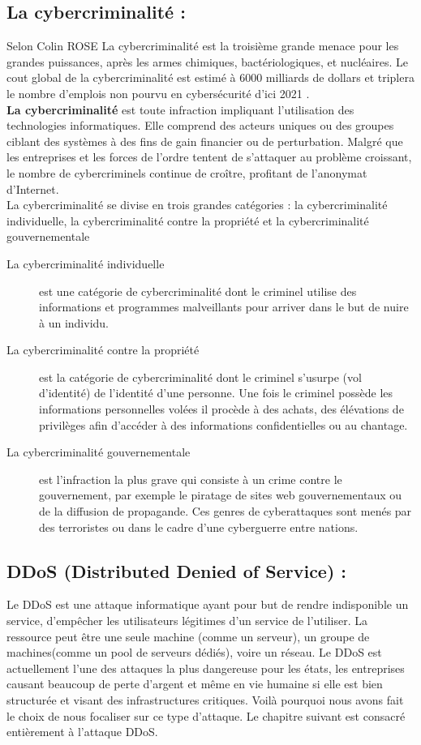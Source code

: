 \subsection{La cybercriminalité : }
Selon Colin ROSE \cite{ref10} La cybercriminalité est la troisième grande menace pour les grandes puissances, après les armes chimiques, bactériologiques, et nucléaires. Le cout global de la cybercriminalité est estimé à 6000 milliards de dollars et triplera le nombre d’emplois non pourvu en cybersécurité d’ici 2021 \cite{ref1112}.\\
\textbf{La cybercriminalité} est toute infraction impliquant l’utilisation des technologies informatiques. Elle comprend des acteurs uniques ou des groupes ciblant des systèmes à des fins de gain financier ou de perturbation. Malgré que les entreprises et les forces de l’ordre tentent de s’attaquer au problème croissant, le nombre de cybercriminels continue de croître, profitant de l’anonymat d’Internet.\\
La cybercriminalité se divise en trois grandes catégories \cite{ref1112} : la cybercriminalité individuelle, la cybercriminalité contre la propriété et la cybercriminalité gouvernementale 
\begin{description}
\item[La cybercriminalité individuelle] est une catégorie de cybercriminalité dont le criminel utilise des informations et programmes malveillants pour arriver dans le but de nuire à un individu.
\item[La cybercriminalité contre la propriété] est la catégorie de cybercriminalité dont le criminel s’usurpe (vol d’identité) de l’identité d’une personne. Une fois le criminel possède les informations personnelles volées il procède à des achats, des élévations de privilèges afin d’accéder à des informations confidentielles ou au chantage.
\item[La cybercriminalité gouvernementale] est l’infraction la plus grave qui consiste à un crime contre le gouvernement, par exemple le piratage de sites web gouvernementaux ou de la diffusion de propagande. Ces genres de cyberattaques sont menés par des terroristes ou dans le cadre d’une cyberguerre entre nations.
\end{description}
\subsection{DDoS (Distributed Denied of Service) : }
Le DDoS est une attaque informatique ayant pour but de rendre indisponible un service, d'empêcher les utilisateurs légitimes d'un service de l'utiliser. La ressource peut être une seule machine (comme un serveur), un groupe de machines(comme un pool de serveurs dédiés), voire un réseau. Le DDoS est actuellement l’une des attaques la plus dangereuse pour les états, les entreprises causant beaucoup de perte d’argent et même en vie humaine si elle est bien structurée et visant des infrastructures critiques\cite{refados}. Voilà pourquoi nous avons fait le choix de nous focaliser sur ce type d’attaque. Le chapitre suivant est consacré entièrement à l’attaque DDoS.
